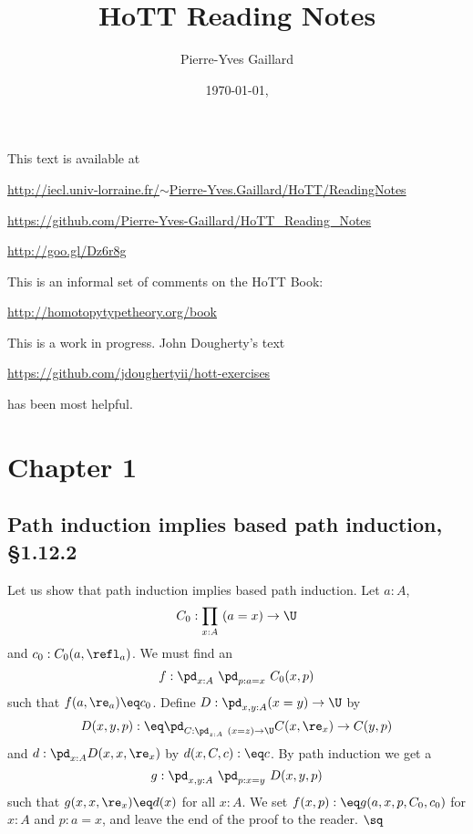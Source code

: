 \documentclass[12pt]{article}
\title{HoTT Reading Notes}
\author{Pierre-Yves Gaillard}
\date{\today, \currenttime}
\begin{document}

\maketitle%

\nn This text is available at 

\nn\href{http://iecl.univ-lorraine.fr/~Pierre-Yves.Gaillard/HoTT/ReadingNotes}{http://iecl.univ-lorraine.fr/$\sim$Pierre-Yves.Gaillard/HoTT/ReadingNotes}


\nn\href{https://github.com/Pierre-Yves-Gaillard/HoTT_Reading_Notes}{https://github.com/Pierre-Yves-Gaillard/HoTT\_Reading\_Notes}

\nn\href{http://goo.gl/Dz6r8g}{http://goo.gl/Dz6r8g}

This is an informal set of comments on the HoTT Book:

\nn\href{http://homotopytypetheory.org/book}{http://homotopytypetheory.org/book}

This is a work in progress. John Dougherty's text 

\nn\href{https://github.com/jdoughertyii/hott-exercises}{https://github.com/jdoughertyii/hott-exercises}

\nn has been most helpful.

\tableofcontents%


\section{Chapter 1}

\subsection{Path induction implies based path induction, \S1.12.2}%

Let us show that path induction implies based path induction. Let $a:A$, 
$$
C_0:\prod_{x:A}\ (a=x)\to\U
$$ 
and $c_0:C_0(a,\refl_a)$. We must find an 
$$
f:\pd_{x:A}\ \pd_{p:a=x}\ C_0(x,p)
$$ 
such that $f(a,\re_a)\eq c_0$. Define $D:\pd_{x,y:A}(x=y)\to\U$ by 
$$
D(x,y,p):\eq\pd_{C:\pd_{z:A}\ (x=z)\to\U}C(x,\re_x)\to C(y,p)
$$ 
and $d:\pd_{x:A}D(x,x,\re_x)$ by $d(x,C,c):\eq c$. By path induction we get a 
$$
g:\pd_{x,y:A}\ \pd_{p:x=y}\ D(x,y,p)
$$ 
such that $g(x,x,\re_x)\eq d(x)$ for all $x:A$. We set $f(x,p):\eq g(a,x,p,C_0,c_0)$ for $x:A$ and $p:a=x$, and leave the end of the proof to the reader. $\sq$
\end{document}
